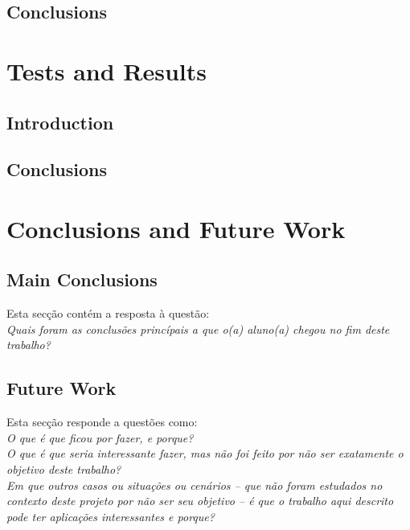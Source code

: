 \documentclass[titlepage,12pt,a4paper,times]{book}
\begin{document}
\section{Conclusions}
\label{chap3:sec:concs}

\chapter{Tests and Results}
\label{chap:res}

\section{Introduction}
\label{chap4:sec:intro}

\section{}
\label{chap4:sec:...}

\section{Conclusions}
\label{chap4:sec:concs}

\chapter{Conclusions and Future Work}
\label{chap:cfw}

\section{Main Conclusions}
\label{sec:main-conc}

Esta secção contém a resposta à questão: \\
\emph{Quais foram as conclusões princípais a que o(a) aluno(a) chegou no fim
deste trabalho?}

\section{Future Work}
\label{sec:future-work}

Esta secção responde a questões como:\\
\emph{O que é que ficou por fazer, e porque?}\\
\emph{O que é que seria interessante fazer, mas não foi feito por não ser
exatamente o objetivo deste trabalho?}\\
\emph{Em que outros casos ou situações ou cenários -- que não foram estudados
no contexto deste projeto por não ser seu objetivo -- é que o trabalho aqui
descrito pode ter aplicações interessantes e porque?}

% 
% 
% 
% 

\backmatter



\end{document}
